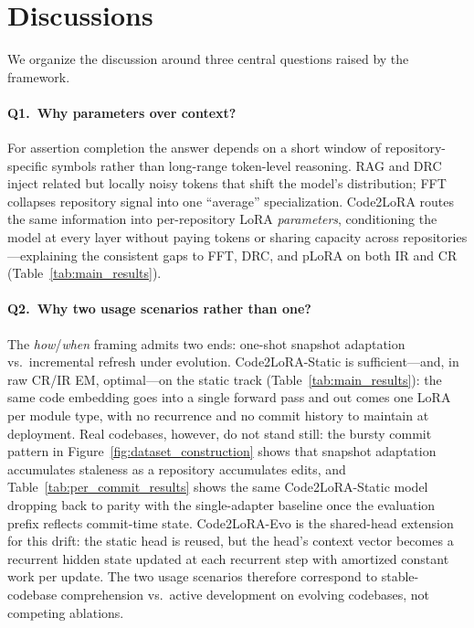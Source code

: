 \documentclass{llmxive}
\providecommand{\codelora}{Code2LoRA\xspace}
\providecommand{\codelorastatic}{\codelora-Static\xspace}
\providecommand{\codeloraevo}{\codelora-Evo\xspace}
\begin{document}
\section{Discussions}
\label{sec:discussion}

We organize the discussion around three central questions raised by the framework.

\paragraph{Q1.\ Why parameters over context?}
For assertion completion the answer depends on a short window of repository-specific symbols rather than long-range token-level reasoning.
RAG and DRC inject related but locally noisy tokens that shift the model's distribution; FFT collapses repository signal into one ``average'' specialization.
\codelora{} routes the same information into per-repository LoRA \emph{parameters}, conditioning the model at every layer without paying tokens or sharing capacity across repositories---explaining the consistent gaps to FFT, DRC, and pLoRA on both IR and CR (Table~\ref{tab:main_results}).

\paragraph{Q2.\ Why two usage scenarios rather than one?}
The \emph{how}/\emph{when} framing admits two ends: one-shot snapshot adaptation vs.\ incremental refresh under evolution.
\codelorastatic{} is sufficient---and, in raw CR/IR EM, optimal---on the static track (Table~\ref{tab:main_results}): the same code embedding goes into a single forward pass and out comes one LoRA per module type, with no recurrence and no commit history to maintain at deployment.
Real codebases, however, do not stand still: the bursty commit pattern in Figure~\ref{fig:dataset_construction} shows that snapshot adaptation accumulates staleness as a repository accumulates edits, and Table~\ref{tab:per_commit_results} shows the same \codelorastatic{} model dropping back to parity with the single-adapter baseline once the evaluation prefix reflects commit-time state.
\codeloraevo{} is the shared-head extension for this drift: the static head is reused, but the head's context vector becomes a recurrent hidden state updated at each recurrent step with amortized constant work per update.
The two usage scenarios therefore correspond to stable-codebase comprehension vs.\ active development on evolving codebases, not competing ablations.
\end{document}
